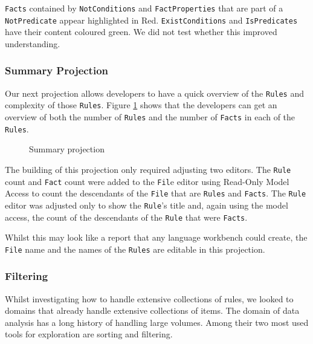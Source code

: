 \texttt{Facts} contained by \texttt{NotConditions} and \texttt{FactProperties} that are part of a \texttt{NotPredicate} appear highlighted in Red.
\texttt{ExistConditions} and \texttt{IsPredicates} have their content coloured green.
We did not test whether this improved understanding.

\subsubsection{Summary Projection}
Our next projection allows developers to have a quick overview of the \texttt{Rules} and complexity of those \texttt{Rules}.
Figure \ref{fig:summaryProjection} shows that the developers can get an overview of both the number of \texttt{Rules} and the number of \texttt{Facts} in each of the \texttt{Rules}.

\begin{figure}[h]
    \centering
    \caption{Summary projection}
    \label{fig:summaryProjection}
\end{figure}

The building of this projection only required adjusting two editors.
The \texttt{Rule} count and \texttt{Fact} count were added to the \texttt{Fil}e editor using Read-Only Model Access to count the descendants of the \texttt{File} that are \texttt{Rules} and \texttt{Facts}.
The \texttt{Rule} editor was adjusted only to show the \texttt{Rule}'s title and, again using the model access, the count of the descendants of the \texttt{Rule} that were \texttt{Facts}.

Whilst this may look like a report that any language workbench could create, the \texttt{File} name and the names of the \texttt{Rules} are editable in this projection.

\subsubsection{Filtering}
Whilst investigating how to handle extensive collections of rules, we looked to domains that already handle extensive collections of items.
The domain of data analysis has a long history of handling large volumes.
Among their two most used tools for exploration are sorting and filtering.

